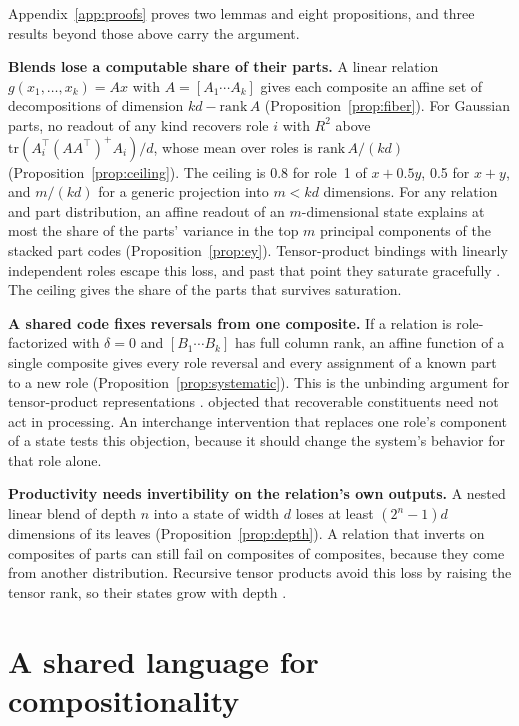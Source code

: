 \documentclass[10pt]{article}
\theoremstyle{plain}
\theoremstyle{remark}
\begin{document}
Appendix~\ref{app:proofs} proves two lemmas and eight propositions, and three results beyond those above carry the argument.

\textbf{Blends lose a computable share of their parts.} A linear relation $g(x_1, \ldots, x_k) = A x$ with $A = [A_1 \cdots A_k]$ gives each composite an affine set of decompositions of dimension $kd - \mathrm{rank}\,A$ (Proposition~\ref{prop:fiber}). For Gaussian parts, no readout of any kind recovers role $i$ with $R^2$ above $\mathrm{tr}(A_i^{\top}(AA^{\top})^{+}A_i)/d$, whose mean over roles is $\mathrm{rank}\,A/(kd)$ (Proposition~\ref{prop:ceiling}). The ceiling is 0.8 for role~1 of $x + 0.5y$, 0.5 for $x + y$, and $m/(kd)$ for a generic projection into $m < kd$ dimensions. For any relation and part distribution, an affine readout of an $m$-dimensional state explains at most the share of the parts' variance in the top $m$ principal components of the stacked part codes (Proposition~\ref{prop:ey}). Tensor-product bindings with linearly independent roles escape this loss, and past that point they saturate gracefully \citep{smolensky1990}. The ceiling gives the share of the parts that survives saturation.

\textbf{A shared code fixes reversals from one composite.} If a relation is role-factorized with $\delta = 0$ and $[B_1 \cdots B_k]$ has full column rank, an affine function of a single composite gives every role reversal and every assignment of a known part to a new role (Proposition~\ref{prop:systematic}). This is the unbinding argument for tensor-product representations \citep{smolensky1990}. \citet{fodor1990} objected that recoverable constituents need not act in processing. An interchange intervention that replaces one role's component of a state tests this objection, because it should change the system's behavior for that role alone.

\textbf{Productivity needs invertibility on the relation's own outputs.} A nested linear blend of depth $n$ into a state of width $d$ loses at least $(2^n - 1)d$ dimensions of its leaves (Proposition~\ref{prop:depth}). A relation that inverts on composites of parts can still fail on composites of composites, because they come from another distribution. Recursive tensor products avoid this loss by raising the tensor rank, so their states grow with depth \citep{smolensky1990}.

\section{A shared language for compositionality}
\label{sec:spectrum}
\end{document}
